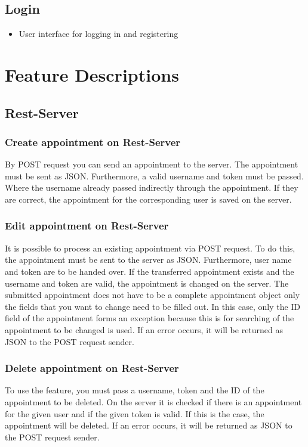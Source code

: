 \documentclass[12pt]{scrartcl}
\begin{document}
    \subsection{Login}
    \begin{itemize}
        \item User interface for logging in and registering
    \end{itemize}
    

    \section{Feature Descriptions}
    \subsection{Rest-Server}
    \subsubsection{Create appointment on Rest-Server}
        By POST request you can send an appointment to the server.
        The appointment must be sent as JSON. Furthermore, a valid username and token must be passed. Where the username
        already passed indirectly through the appointment.
        If they are correct, the appointment for the corresponding user is saved on the server.
    
    \subsubsection{Edit appointment on Rest-Server}
        It is possible to process an existing appointment via POST request. To do this, the appointment must be sent to the server as JSON.
        Furthermore, user name and token are to be handed over. If the transferred appointment exists and the username and token are valid,
        the appointment is changed on the server. The submitted appointment does not have to be a complete appointment object
        only the fields that you want to change need to be filled out. In this case, only the ID field of the appointment forms an exception because this is for searching
        of the appointment to be changed is used.
        If an error occurs, it will be returned as JSON to the POST request sender.

    \subsubsection{Delete appointment on Rest-Server}
        To use the feature, you must pass a username, token and the ID of the appointment to be deleted.
        On the server it is checked if there is an appointment for the given user and if the given token is valid.
        If this is the case, the appointment will be deleted.
        If an error occurs, it will be returned as JSON to the POST request sender.
    
\end{document}
